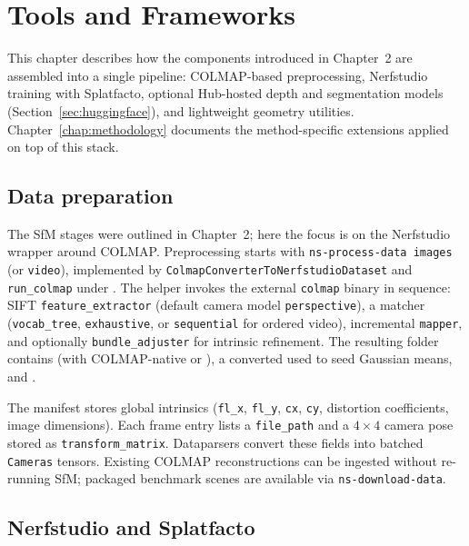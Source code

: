 ﻿\chapter{Tools and Frameworks}
\label{chap:tools}

This chapter describes how the components introduced in Chapter~2 are assembled into a single pipeline: COLMAP-based preprocessing, Nerfstudio training with Splatfacto, optional Hub-hosted depth and segmentation models (Section~\ref{sec:huggingface}), and lightweight geometry utilities. Chapter~\ref{chap:methodology} documents the method-specific extensions applied on top of this stack.

\section{Data preparation}
\label{sec:data_preparation}

The SfM stages were outlined in Chapter~2; here the focus is on the Nerfstudio wrapper around COLMAP. Preprocessing starts with \texttt{ns-process-data images} (or \texttt{video}), implemented by \texttt{Colmap\-Converter\-To\-Nerfstudio\-Dataset} and \texttt{run\_colmap} under . The helper invokes the external \texttt{colmap} binary in sequence: SIFT \texttt{feature\_extractor} (default camera model \texttt{perspective}), a matcher (\texttt{vocab\_tree}, \texttt{exhaustive}, or \texttt{sequential} for ordered video), incremental \texttt{mapper}, and optionally \texttt{bundle\_adjuster} for intrinsic refinement. The resulting folder contains  (with COLMAP-native  or ), a converted  used to seed Gaussian means, and .

The manifest stores global intrinsics (\texttt{fl\_x}, \texttt{fl\_y}, \texttt{cx}, \texttt{cy}, distortion coefficients, image dimensions). Each frame entry lists a \texttt{file\_path} and a $4\times4$ camera pose stored as \texttt{transform\_matrix}. Dataparsers convert these fields into batched \texttt{Cameras} tensors. Existing COLMAP reconstructions can be ingested without re-running SfM; packaged benchmark scenes are available via \texttt{ns-download-data}.

\section{Nerfstudio and Splatfacto}
\label{sec:splatfacto_gsplat}

